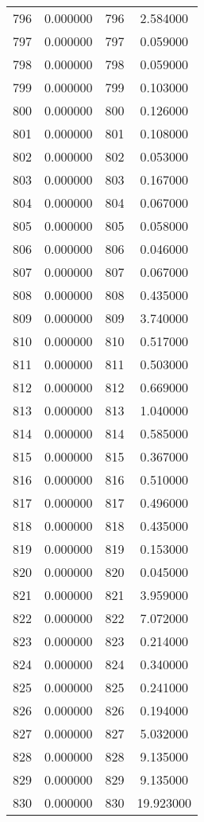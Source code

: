\documentclass[12pt]{article}
\begin{document}
\begin{longtable}{@{}cccc@{}}
796 & 0.000000 & 796 & 2.584000 \\
797 & 0.000000 & 797 & 0.059000 \\
798 & 0.000000 & 798 & 0.059000 \\
799 & 0.000000 & 799 & 0.103000 \\
800 & 0.000000 & 800 & 0.126000 \\
801 & 0.000000 & 801 & 0.108000 \\
802 & 0.000000 & 802 & 0.053000 \\
803 & 0.000000 & 803 & 0.167000 \\
804 & 0.000000 & 804 & 0.067000 \\
805 & 0.000000 & 805 & 0.058000 \\
806 & 0.000000 & 806 & 0.046000 \\
807 & 0.000000 & 807 & 0.067000 \\
808 & 0.000000 & 808 & 0.435000 \\
809 & 0.000000 & 809 & 3.740000 \\
810 & 0.000000 & 810 & 0.517000 \\
811 & 0.000000 & 811 & 0.503000 \\
812 & 0.000000 & 812 & 0.669000 \\
813 & 0.000000 & 813 & 1.040000 \\
814 & 0.000000 & 814 & 0.585000 \\
815 & 0.000000 & 815 & 0.367000 \\
816 & 0.000000 & 816 & 0.510000 \\
817 & 0.000000 & 817 & 0.496000 \\
818 & 0.000000 & 818 & 0.435000 \\
819 & 0.000000 & 819 & 0.153000 \\
820 & 0.000000 & 820 & 0.045000 \\
821 & 0.000000 & 821 & 3.959000 \\
822 & 0.000000 & 822 & 7.072000 \\
823 & 0.000000 & 823 & 0.214000 \\
824 & 0.000000 & 824 & 0.340000 \\
825 & 0.000000 & 825 & 0.241000 \\
826 & 0.000000 & 826 & 0.194000 \\
827 & 0.000000 & 827 & 5.032000 \\
828 & 0.000000 & 828 & 9.135000 \\
829 & 0.000000 & 829 & 9.135000 \\
830 & 0.000000 & 830 & 19.923000 \\

\end{longtable}
\end{document}
